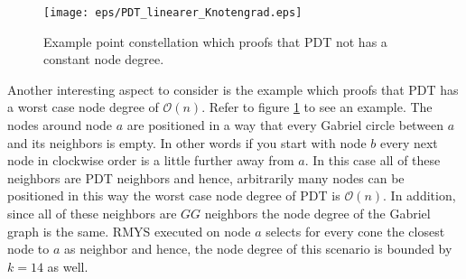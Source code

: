 \begin{figure}[h!]
\centering
\texttt{[image: eps/PDT\_linearer\_Knotengrad.eps]}
\caption{Example point constellation which proofs that PDT not has a constant node degree. }
\label{fig:PDT_linearer_Knotengrad}
\end{figure}

Another interesting aspect to consider is the example which proofs that PDT has a worst case node degree of $\mathcal{O}(n) $.
Refer to figure \ref{fig:PDT_linearer_Knotengrad} to see an example.
The nodes around node $a $ are positioned in a way that every Gabriel circle between $a $ and its neighbors is empty.
In other words if you start with node $b $ every next node in clockwise order is a little further away from $a $.
In this case all of these neighbors are PDT neighbors and hence, arbitrarily many nodes can be positioned in this way the worst case node degree of PDT is $\mathcal{O}(n) $.
In addition, since all of these neighbors are $GG $ neighbors the node degree of the Gabriel graph is the same.
RMYS executed on node $a $ selects for every cone the closest node to $a $ as neighbor and hence, the node degree of this scenario is bounded by $k=14 $ as well.




